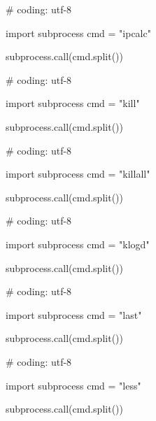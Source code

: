 \begin{mylisting}[label={lst:acpid},language=sh,caption=ipcalc]

# coding: utf-8

import subprocess
cmd = "ipcalc"

subprocess.call(cmd.split())

\end{mylisting}

\begin{mylisting}[label={lst:acpid},language=sh,caption=kill]

# coding: utf-8

import subprocess
cmd = "kill"

subprocess.call(cmd.split())

\end{mylisting}

\begin{mylisting}[label={lst:acpid},language=sh,caption=killall]

# coding: utf-8

import subprocess
cmd = "killall"

subprocess.call(cmd.split())

\end{mylisting}

\begin{mylisting}[label={lst:acpid},language=sh,caption=klogd]

# coding: utf-8

import subprocess
cmd = "klogd"

subprocess.call(cmd.split())

\end{mylisting}

\begin{mylisting}[label={lst:acpid},language=sh,caption=last]

# coding: utf-8

import subprocess
cmd = "last"

subprocess.call(cmd.split())

\end{mylisting}

\begin{mylisting}[label={lst:acpid},language=sh,caption=less]

# coding: utf-8

import subprocess
cmd = "less"

subprocess.call(cmd.split())

\end{mylisting}

